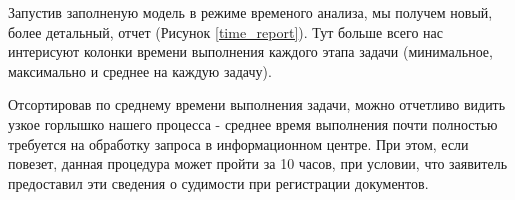 Запустив заполненую модель в режиме временого анализа,
мы получем новый, более детальный, отчет (Рисунок
\ref{time_report}). Тут больше всего нас интерисуют колонки
времени выполнения каждого этапа задачи (минимальное,
максимально и среднее на каждую задачу).

Отсортировав по среднему времени выполнения задачи,
можно отчетливо видить узкое горлышко нашего процесса -
среднее время выполнения почти полностью требуется на обработку
запроса в информационном центре. При этом, если повезет,
данная процедура может пройти за 10 часов, при условии, что
заявитель предоставил эти сведения о судимости
при регистрации документов.

